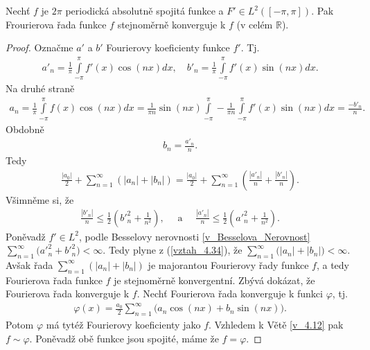 \begin{theorem}\label{v_4.32}
Nechť $f$ je $2\pi$ periodická absolutně spojitá funkce a $F' \in L^2 ([-\pi, \pi])$. Pak Frourierova řada funkce $f$ stejnoměrně konverguje k $f$ (v celém $\mathbb{R}$).
\begin{proof}
Označme $a'$ a $b'$ Fourierovy koeficienty funkce $f'$. Tj.
\begin{align*}
a'_n = \frac{1}{\pi} \int \limits_{-\pi}^\pi f'(x) \cos (nx) dx, \quad b'_n = \frac{1}{\pi} \int \limits_{-\pi}^\pi f'(x) \sin (nx) dx.
\end{align*}
Na druhé straně
\begin{align*}
a_n = \frac{1}{\pi} \int \limits_{-\pi}^\pi f(x) \cos (nx) dx = \frac{1}{\pi n} \sin (nx) \int \limits_{-\pi}^\pi - \frac{1}{\pi n} \int \limits_{-\pi}^\pi f'(x) \sin (nx) dx = \frac{-b'_n}{n}.
\end{align*}
Obdobně
\begin{align*}
b_n = \frac{a'_n}{n}.
\end{align*}
Tedy
\begin{align}
\label{vztah_4.34}
\frac{|a_0|}{2} + \sum \limits _{n=1}^\infty (|a_n| + |b_n|) = \frac{|a_0|}{2} + \sum \limits _{n=1}^\infty \left( \frac{|a'_n|}{n} + \frac{|b'_n|}{n} \right).
\end{align}
Všimněme si, že
\begin{align*}
\frac{|b'_n|}{n} \leq \frac{1}{2} \left( b'^2_n + \frac{1}{n^2} \right), \quad \textrm{ a } \quad \frac{|a'_n|}{n} \leq \frac{1}{2} \left( a'^2_n + \frac{1}{n^2} \right).
\end{align*}
Poněvadž $f' \in L^2$, podle Besselovy nerovnosti \ref{v_Besselova_Nerovnost} $\sum \limits _{n=1}^{\infty} \Big(a'^2_n + b'^2_n\Big) < \infty$. Tedy plyne z (\eqref{vztah_4.34}), že $\sum \limits _{n=1}^{\infty} \Big(|a_n| + |b_n|\Big) < \infty$. Avšak řada $\sum \limits _{n=1}^{\infty} (|a_n| + |b_n|)$ je majorantou Fourierovy řady funkce $f$, a tedy Fourierova řada funkce $f$ je stejnoměrně konvergentní. Zbývá dokázat, že Fourierova řada konverguje k $f$. Nechť Fourierova řada konverguje k funkci $\varphi$, tj.
\begin{align*}
\varphi (x) = \frac{a_0}{2} \sum \limits _{n=1}^{\infty} \Big(a_n \cos (nx) + b_n \sin (nx)\Big).
\end{align*}
Potom $\varphi$ má tytéž Fourierovy koeficienty jako $f$. Vzhledem k Větě \ref{v_4.12} pak $f \sim \varphi$. Poněvadž obě funkce jsou spojité, máme že $f = \varphi$.
\end{proof}
\end{theorem}

